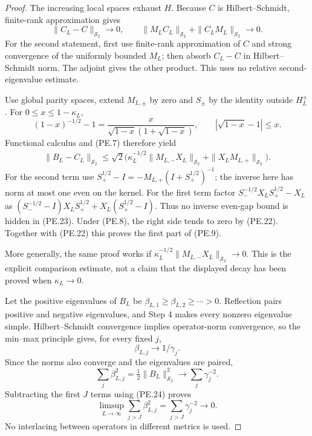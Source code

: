 \begin{proof}
The increasing local spaces exhaust \(H\).
Because \(C\) is Hilbert--Schmidt, finite-rank approximation gives
\[
 \|C_L-C\|_{\mathcal S_2}\to0,\qquad
 \|M_LC_L\|_{\mathcal S_2}
       +\|C_LM_L\|_{\mathcal S_2}\to0 .
 \tag{PE.22}
\]
For the second statement, first use finite-rank approximation of
\(C\) and strong convergence of the uniformly bounded \(M_L\);
then absorb \(C_L-C\) in Hilbert--Schmidt norm.
The adjoint gives the other product.
This uses no relative second-eigenvalue estimate.

Use global parity spaces, extend \(M_{L,\pm}\) by zero and
\(S_\pm\) by the identity outside \(H_L^\pm\).
For \(0\le x\le1-\kappa_L\),
\[
 (1-x)^{-1/2}-1
       =\frac{x}{\sqrt{1-x}(1+\sqrt{1-x})},
 \qquad
 |\sqrt{1-x}-1|\le x .
\]
Functional calculus and (PE.7) therefore yield
\[
 \begin{aligned}
 \|B_L-C_L\|_{\mathcal S_2}
 \le\sqrt2\bigl(
      \kappa_L^{-1/2}\|M_{L,-}X_L\|_{\mathcal S_2}
          +\|X_LM_{L,+}\|_{\mathcal S_2}\bigr).
 \end{aligned}
 \tag{PE.23}
\]
For the second term use
\(S_+^{1/2}-I=-M_{L,+}(I+S_+^{1/2})^{-1}\);
the inverse here has norm at most one even on the kernel.
For the first term factor
\(S_-^{-1/2}X_LS_+^{1/2}-X_L\) as
\((S_-^{-1/2}-I)X_LS_+^{1/2}
 +X_L(S_+^{1/2}-I)\).
Thus no inverse even-gap bound is hidden in (PE.23).
Under (PE.8), the right side tends to zero by (PE.22).
Together with (PE.22) this proves the first part of (PE.9).

More generally, the same proof works if
\(\kappa_L^{-1/2}\|M_{L,-}X_L\|_{\mathcal S_2}\to0\).
This is the explicit comparison estimate, not a claim that the
displayed decay has been proved when \(\kappa_L\to0\).

Let the positive eigenvalues of \(B_L\) be
\(\beta_{L,1}\ge\beta_{L,2}\ge\cdots>0\).
Reflection pairs positive and negative eigenvalues, and Step 4
makes every nonzero eigenvalue simple.
Hilbert--Schmidt convergence implies operator-norm convergence,
so the min--max principle gives, for every fixed \(j\),
\[
                    \beta_{L,j}\to1/\gamma_j .
 \tag{PE.24}
\]
Since the norms also converge and the eigenvalues are paired,
\[
  \sum_j\beta_{L,j}^2=\tfrac12\|B_L\|_{\mathcal S_2}^2
                   \longrightarrow
                    \sum_j\gamma_j^{-2}.
 \tag{PE.25}
\]
Subtracting the first \(J\) terms using (PE.24) proves
\[
 \limsup_{L\to\infty}\sum_{j>J}\beta_{L,j}^2
                         =\sum_{j>J}\gamma_j^{-2}\to0 .
 \tag{PE.26}
\]
No interlacing between operators in different metrics is used.


\end{proof}
